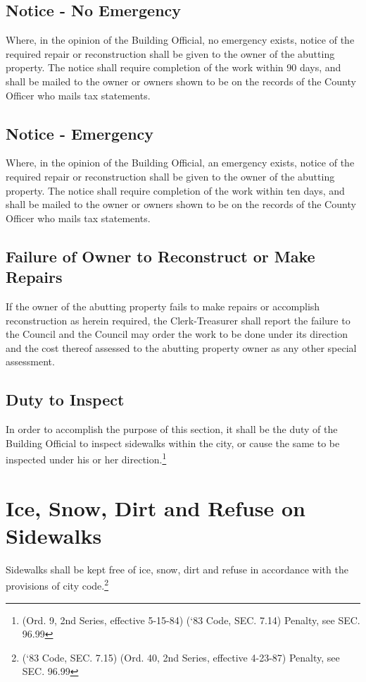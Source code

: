 \subsection{Notice - No Emergency}
Where, in the opinion of the Building Official, no emergency exists, notice of the required repair or reconstruction shall be given to the owner of the abutting property.  The notice shall require completion of the work within 90 days, and shall be mailed to the owner or owners shown to be on the records of the County Officer who mails tax statements.
\subsection{Notice - Emergency}
Where, in the opinion of the Building Official, an emergency exists, notice of the required repair or reconstruction shall be given to the owner of the abutting property.  The notice shall require completion of the work within ten days, and shall be mailed to the owner or owners shown to be on the records of the County Officer who mails tax statements.
\subsection{Failure of Owner to Reconstruct or Make Repairs}
If the owner of the abutting property fails to make repairs or accomplish reconstruction as herein required, the Clerk-Treasurer shall report the failure to the Council and the Council may order the work to be done under its direction and the cost thereof assessed to the abutting property owner as any other special assessment.
\subsection{Duty to Inspect}
In order to accomplish the purpose of this section, it shall be the duty of the Building Official to inspect sidewalks within the city, or cause the same to be inspected under his or her direction.\footnote{(Ord. 9, 2nd Series, effective 5-15-84) (‘83 Code, SEC. 7.14)  Penalty, see SEC. 96.99}

\section{Ice, Snow, Dirt and Refuse on Sidewalks}
Sidewalks shall be kept free of ice, snow, dirt and refuse in accordance with the provisions of city code.\footnote{(‘83 Code, SEC. 7.15)  (Ord. 40, 2nd Series, effective 4-23-87)  Penalty, see SEC. 96.99}


